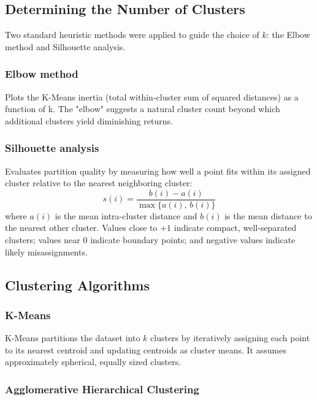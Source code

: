 \documentclass[runningheads,a4paper,11pt]{report}
\begin{document}
\subsection{Determining the Number of Clusters}
\label{section:clusterCount}

Two standard heuristic methods were applied to guide the choice of $k$: the Elbow method and Silhouette analysis.

\subsubsection{Elbow method}

Plots the K-Means inertia (total within-cluster sum of squared distances) as a function of k. The "elbow" suggests a natural cluster count beyond which additional clusters yield diminishing returns.

\subsubsection{Silhouette analysis}

Evaluates partition quality by measuring how well a point fits within its assigned cluster relative to the nearest neighboring cluster:
\[
    s(i) = \frac{b(i) - a(i)}{\max\{a(i),\, b(i)\}}
\]
where $a(i)$ is the mean intra-cluster distance and $b(i)$ is the mean distance to the nearest other cluster. Values close to $+1$ indicate compact, well-separated clusters; values near $0$ indicate boundary points; and negative values indicate likely misassignments.

\subsection{Clustering Algorithms}
\label{section:clusteringAlgorithms}

\subsubsection{K-Means}

K-Means partitions the dataset into $k$ clusters by iteratively assigning each point to its nearest centroid and updating centroids as cluster means. It assumes approximately spherical, equally sized clusters.

\subsubsection{Agglomerative Hierarchical Clustering}
\end{document}
